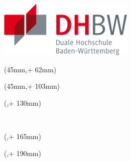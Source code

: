\newlength{\bindekorrektur}
\newlength{\seitenanfang}
\newlength{\seitenbreite}
  
\setlength{\bindekorrektur}{-46mm}   %
\setlength{\seitenanfang}{0mm}       %
\setlength{\seitenbreite}{297mm}

\noindent\includegraphics[width=0.49\textwidth]{img/DHBW-Logo.pdf}
\hfill

\begin{textblock*}{128mm}(45mm,\seitenanfang + 62mm) %
  \centering\Large\sffamily
  \vspace{4mm} %
  \textbf{\dhbwtitel}
\end{textblock*}%

\begin{textblock*}{128mm}(45mm,\seitenanfang + 103mm)
  \centering\large\sffamily
  \dhbwautor
\end{textblock*}

\begin{textblock*}{\seitenbreite}(\bindekorrektur,\seitenanfang + 130mm)
  \centering\large\sffamily
  \dhbwtyp\\
  \begin{small}\dhbwthesistype \end{small}\\
  \vspace{2mm}
  \dhbwstudiengangname
\end{textblock*}

\begin{textblock*}{\seitenbreite}(\bindekorrektur,\seitenanfang + 165mm)
  \centering\large\sffamily
  \dhbwfakultaetlang\\
  \vspace{2mm}
  \dhbwkoerperschaft
\end{textblock*}

\begin{textblock*}{\seitenbreite}(\bindekorrektur,\seitenanfang + 190mm)
  \centering\large 
  \textsf{\dhbwdatum}
\end{textblock*}

